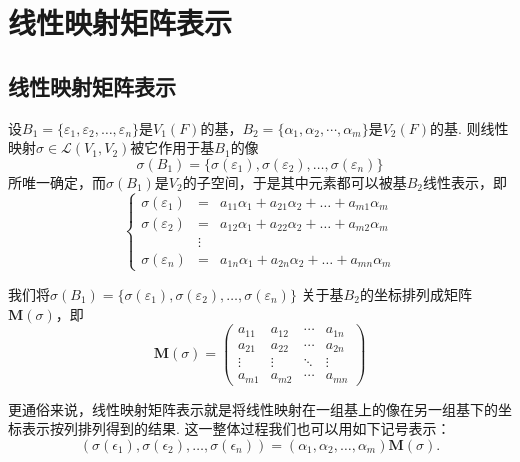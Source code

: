 \chapter{线性映射矩阵表示}

\section{线性映射矩阵表示}
\begin{definition}\label{def:7:线性映射矩阵表示}
    设$B_1=\{\varepsilon_1,\varepsilon_2,\ldots,\varepsilon_n\}$是$V_1(F)$的基，$B_2=\{\alpha_1,\alpha_2,\cdots,\alpha_m\}$是$V_2(F)$的基.
    则线性映射$\sigma \in \mathcal{L}(V_1,V_2)$被它作用于基$B_1$的像
    \[\sigma(B_1)=\{\sigma(\varepsilon_1),\sigma(\varepsilon_2),\ldots,\sigma(\varepsilon_n)\}\]
    所唯一确定，而$\sigma(B_1)$是$V_2$的子空间，于是其中元素都可以被基$B_2$线性表示，即
    \[ \left\{
     \begin{array}{rcl}
        \sigma(\varepsilon_1)&=&a_{11}\alpha_1+a_{21}\alpha_2+\ldots+a_{m1}\alpha_m \\
        \sigma(\varepsilon_2)&=&a_{12}\alpha_1+a_{22}\alpha_2+\ldots+a_{m2}\alpha_m \\
        &\vdots& \\
        \sigma(\varepsilon_n)&=&a_{1n}\alpha_1+a_{2n}\alpha_2+\ldots+a_{mn}\alpha_m
     \end{array}
    \right. \]

    我们将$\sigma(B_1)=\{\sigma(\varepsilon_1),\sigma(\varepsilon_2),\ldots,\sigma(\varepsilon_n)\}$
    关于基$B_2$的坐标排列成矩阵$\mathbf{M}(\sigma)$，即
    \[\mathbf{M}(\sigma)=\begin{pmatrix}
        a_{11} & a_{12} & \cdots & a_{1n} \\
        a_{21} & a_{22} & \cdots & a_{2n} \\
        \vdots & \vdots & \ddots & \vdots \\
        a_{m1} & a_{m2} & \cdots & a_{mn}
    \end{pmatrix}\]
\end{definition}
更通俗来说，线性映射矩阵表示就是将线性映射在一组基上的像在另一组基下的坐标表示按列排列得到的结果.
这一整体过程我们也可以用如下记号表示：
\begin{equation}\label{eq:7:线性映射矩阵表示}
    (\sigma(\epsilon_1),\sigma(\epsilon_2),\ldots,\sigma(\epsilon_n))=(\alpha_1,\alpha_2,\ldots,\alpha_m)\mathbf{M}(\sigma).
\end{equation}


